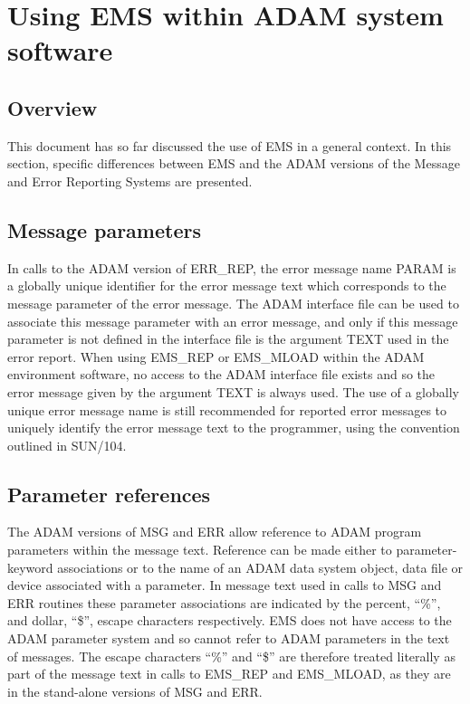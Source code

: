 \section {Using EMS within ADAM system software} \label{ADAM_sect}

\subsection {Overview}

This document has so far discussed the use of EMS in a general context. 
In this section, specific differences between EMS and the ADAM versions of
the Message and Error Reporting Systems are presented.


\subsection {Message parameters}

In calls to the ADAM version of ERR\_REP, the error message name PARAM is a 
globally unique identifier for the error message text which corresponds to
the message parameter of the error message.
The ADAM interface file can be used to associate this message parameter with an 
error message, and only if this message parameter is not defined in the 
interface file is the argument TEXT used in the error report.
When using EMS\_REP or EMS\_MLOAD within the ADAM environment 
software, no access to the ADAM interface file exists and so the error message
given by the argument TEXT is always used.
The use of a globally unique error message name is still recommended for 
reported error messages to uniquely identify the error message text to the
programmer, using the convention outlined in SUN/104.


\subsection {Parameter references}

The ADAM versions of MSG and ERR allow reference to ADAM program
parameters within the message text. 
Reference can be made either to parameter-keyword associations or to the name of
an ADAM data system object, data file or device associated with a parameter.
In message text used in calls to MSG and ERR routines these parameter
associations are indicated by the percent, ``\%'', and dollar, ``\$'', escape
characters respectively.
EMS does not have access to the ADAM parameter system and so cannot refer
to ADAM parameters in the text of  messages.
The escape characters ``\%'' and ``\$'' are therefore treated literally as 
part of the message text in calls to EMS\_REP and EMS\_MLOAD, 
as they are in the stand-alone versions of MSG and ERR.


